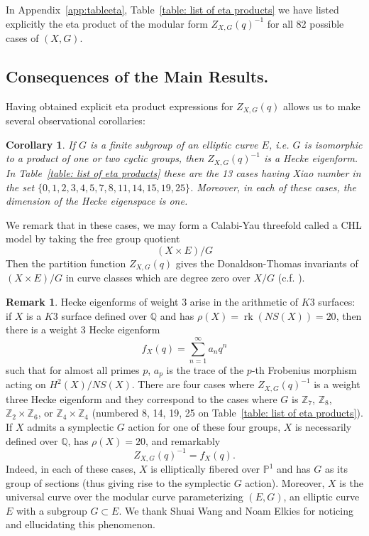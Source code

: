 \documentclass{amsart}
\newtheorem{corollary}[theorem]{Corollary}
\theoremstyle{definition}
\newtheorem{remark}[theorem]{Remark}
\newcommand{\ZZ} {{\mathbb Z}}		%
\newcommand{\QQ} {{\mathbb Q}}		%
\newcommand{\PP}{\mathbb{P}}
\begin{document}
In Appendix~\ref{app:tableeta}, Table~\ref{table: list of eta
products} we have listed explicitly the eta product of the modular form
$Z_{X,G}(q)^{-1}$ for all 82 possible cases of $(X,G)$.

\subsection{Consequences of the Main Results.}  Having obtained
explicit eta product expressions for $Z_{X,G}(q)$ allows us to make
several observational corollaries:

\begin{corollary}\label{cor: if G is a subgp of E then Zinv is a Hecke
eigenform} If $G$ is a finite subgroup of an elliptic curve $E$,
i.e. $G$ is isomorphic to a product of one or two cyclic groups, then
$Z_{X,G}(q)^{-1}$ is a Hecke eigenform. In Table~\ref{table: list of
eta products} these are the 13 cases having Xiao number in the set
$\{0,1,2,3,4,5,7,8,11,14,15,19,25 \}$. Moreover, in each of these
cases, the dimension of the Hecke eigenspace is one.
\end{corollary}

We remark that in these cases, we may form a Calabi-Yau threefold
called a CHL model by taking the free group quotient
\[
(X\times E)/G
\]
Then the partition function $Z_{X,G}(q)$ gives the Donaldson-Thomas
invariants of $(X\times E)/G$ in curve classes which are degree zero
over $X/G$ (c.f. \cite{bryan2018chl}).


\begin{remark}\label{rem: weight 3 Hecke case corresponds to arithmetic}
Hecke eigenforms of weight 3 arise in the arithmetic of $K3$ surfaces:
if $X$ is a $K3$ surface defined over $\QQ$ and has 
$\rho (X)=\operatorname{rk}(NS(X))=20$, then there is a weight 3 Hecke
eigenform
\[
f_{X}(q) = \sum_{n=1}^{\infty} a_{n}q^{n}
\]
such that for almost all primes $p$, $a_{p}$ is the trace of the
$p$-th Frobenius morphism acting on $H^{2}(X)/NS(X)$. There are four
cases where $Z_{X,G}(q)^{-1}$ is a weight three Hecke eigenform and
they correspond to the cases where $G$ is $\ZZ _7$,  $\ZZ _8$,  $\ZZ
_2\times \ZZ _6$, or  $\ZZ _4\times \ZZ _4$  (numbered 8, 14, 19, 25
on Table~\ref{table: list of eta products}). If $X$ admits a
symplectic $G$ action for one of these four groups, $X$ is necessarily
defined over $\QQ$, has $\rho (X)=20$, and remarkably
\[
Z_{X,G}(q)^{-1} = f_{X}(q).
\]
Indeed, in each of these cases, $X$ is elliptically fibered over
$\PP^{1}$ and has $G$ as its group of sections (thus giving rise to
the symplectic $G$ action). Moreover, $X$ is the universal curve over
the modular curve parameterizing $(E,G)$, an elliptic curve $E$ with a
subgroup $G\subset E$. We thank Shuai Wang and Noam Elkies for
noticing and ellucidating this phenomenon. 
\end{remark}
\end{document}
